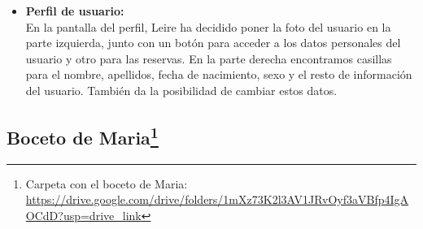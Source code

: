 \begin{itemize}
    \item\textbf{Perfil de usuario:} \\ En la pantalla del perfil, Leire ha decidido poner la foto del usuario en la parte izquierda, junto con un botón para acceder a los datos personales del usuario y otro para las reservas.
    En la parte derecha encontramos casillas para el nombre, apellidos, fecha de nacimiento, sexo y el resto de información del usuario. También da la posibilidad de cambiar estos datos.
    
\end{itemize}
\subsection[Boceto de Maria]{Boceto de Maria\footnote{Carpeta con el boceto de Maria: \url{https://drive.google.com/drive/folders/1mXz73K2l3AV1JRvOyf3aVBfp4IgAOCdD?usp=drive_link}}}

